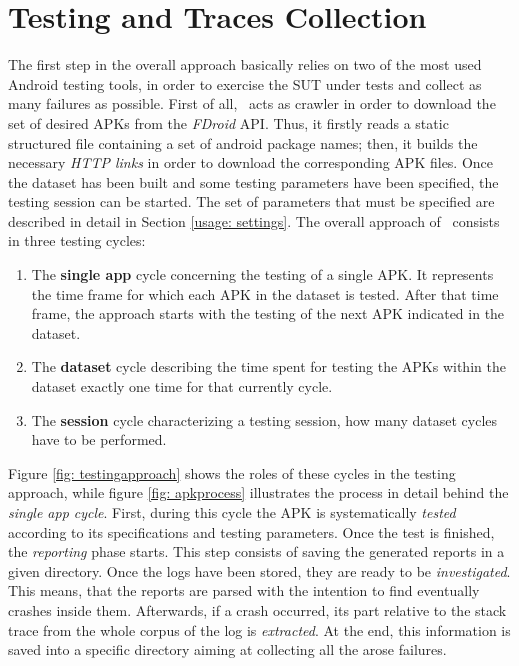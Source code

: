 \section{Testing and Traces Collection}
\label{approach:testing}
The first step in the overall approach basically relies on two of the most used Android testing tools, in order to exercise the SUT under tests and collect as many failures as possible. 
First of all, \toolname\ acts as crawler in order to download the set of desired APKs from the \textit{FDroid} API. 
Thus, it firstly reads a static structured file containing a set of android package names; then, it builds the necessary \textit{HTTP links} in order to download the corresponding APK files. 
Once the dataset has been built and some testing parameters have been specified, the testing session can be started. 
The set of parameters that must be specified are described in detail in Section \ref{usage: settings}.
The overall approach of \toolname\ consists in three testing cycles: 
\begin{enumerate}
\item 
The \textbf{single app} cycle concerning the testing of a single APK. It represents the time frame for which each APK in the dataset is tested. After that time frame, the approach starts with the testing of the next APK indicated in the dataset. 
\item The \textbf{dataset} cycle describing the time spent for testing the APKs within the dataset exactly one time for that currently cycle. 
\item The \textbf{session} cycle characterizing a testing session, \ie how many dataset cycles have to be performed. 
\end{enumerate}
Figure \ref{fig: testingapproach} shows the roles of these cycles in the testing approach, while figure \ref{fig: apkprocess} illustrates the process in detail behind the \textit{single app cycle}. 
First, during this cycle the APK is systematically \textit{tested} according to its specifications and testing parameters. 
Once the test is finished, the \textit{reporting} phase starts. 
This step consists of saving the generated reports in a given directory. 
Once the logs have been stored, they are ready to be \textit{investigated}. This means, that the reports are parsed with the intention to find eventually crashes inside them. 
Afterwards, if a crash occurred, its part relative to the stack trace from the whole corpus of the log is \textit{extracted}. At the end, this information is saved into a specific directory aiming at collecting all the arose failures.

